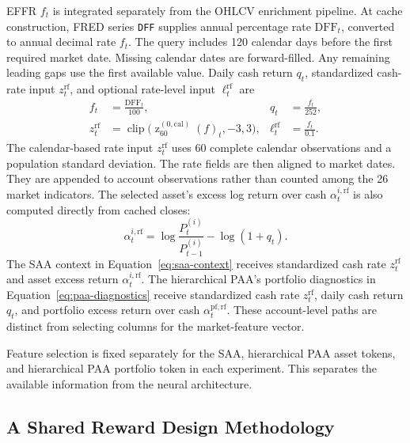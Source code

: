 EFFR \(f_t\) is integrated separately from the OHLCV enrichment pipeline. At cache construction, FRED series \texttt{DFF} supplies annual percentage rate \(\mathrm{DFF}_t\), converted to annual decimal rate \(f_t\). The query includes 120 calendar days before the first required market date. Missing calendar dates are forward-filled. Any remaining leading gaps use the first available value. Daily cash return \(q_t\), standardized cash-rate input \(z_t^{\mathrm{rf}}\), and optional rate-level input \(\ell_t^{\mathrm{rf}}\) are
\begin{equation}
\begin{aligned}
f_t&=\frac{\mathrm{DFF}_t}{100},&q_t&=\frac{f_t}{252},\\
z_t^{\mathrm{rf}}&=\operatorname{clip}\big(\operatorname z_{60}^{(0,\mathrm{cal})}(f)_t,-3,3\big),
&\ell_t^{\mathrm{rf}}&=\frac{f_t}{0.1}.
\end{aligned}
\label{eq:cash-rate}
\end{equation}
The calendar-based rate input \(z_t^{\mathrm{rf}}\) uses 60 complete calendar observations and a population standard deviation. The rate fields are then aligned to market dates. They are appended to account observations rather than counted among the 26 market indicators. The selected asset's excess log return over cash \(\alpha_t^{i,\mathrm{rf}}\) is also computed directly from cached closes:
\begin{equation}
\alpha_t^{i,\mathrm{rf}}=\log\frac{P_t^{(i)}}{P_{t-1}^{(i)}}-\log(1+q_t).
\label{eq:asset-excess-cash}
\end{equation}
The SAA context in Equation~\eqref{eq:saa-context} receives standardized cash rate \(z_t^{\mathrm{rf}}\) and asset excess return \(\alpha_t^{i,\mathrm{rf}}\). The hierarchical PAA's portfolio diagnostics in Equation~\eqref{eq:paa-diagnostics} receive standardized cash rate \(z_t^{\mathrm{rf}}\), daily cash return \(q_t\), and portfolio excess return over cash \(\alpha_t^{\mathrm{pf,rf}}\). These account-level paths are distinct from selecting columns for the market-feature vector.

Feature selection is fixed separately for the SAA, hierarchical PAA asset tokens, and hierarchical PAA portfolio token in each experiment. This separates the available information from the neural architecture.

\subsection{A Shared Reward Design Methodology}
\label{sec:reward}

